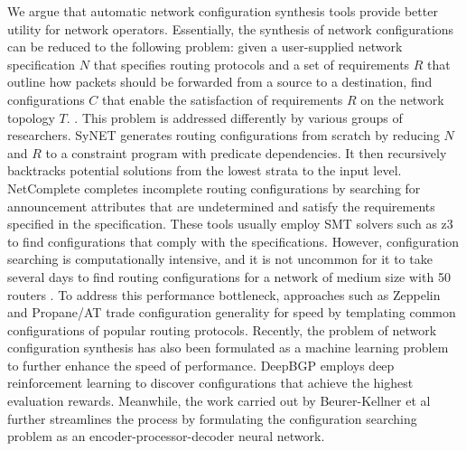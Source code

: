 \documentclass{uiucthesis2021}
\begin{document}
\noindent We argue that automatic network configuration synthesis tools provide better utility for network operators. Essentially, the synthesis of network configurations can be reduced to the following problem: given a user-supplied network specification $N$ that specifies routing protocols and a set of requirements $R$ that outline how packets should be forwarded from a source to a destination, find configurations $C$ that enable the satisfaction of requirements $R$ on the network topology $T$. \cite{10.1145/3098822.3098834}. This problem is addressed differently by various groups of researchers. SyNET \cite{10.1145/3098822.3098834} generates routing configurations from scratch by reducing $N$ and $R$ to a constraint program with predicate dependencies. It then recursively backtracks potential solutions from the lowest strata to the input level. NetComplete \cite{10.5555/3307441.3307491} completes incomplete routing configurations by searching for announcement attributes that are undetermined and satisfy the requirements specified in the specification. These tools usually employ SMT solvers such as z3 \cite{de2008z3} to find configurations that comply with the specifications. However, configuration searching is computationally intensive, and it is not uncommon for it to take several days to find routing configurations for a network of medium size with 50 routers \cite{10.5555/3307441.3307491}. To address this performance bottleneck, approaches such as Zeppelin \cite{10.1145/3179425} and Propane/AT \cite{10.1145/3062341.3062367} trade configuration generality for speed by templating common configurations of popular routing protocols. Recently, the problem of network configuration synthesis has also been formulated as a machine learning problem to further enhance the speed of performance. DeepBGP \cite{10.1145/3405671.3405816} employs deep reinforcement learning to discover configurations that achieve the highest evaluation rewards. Meanwhile, the work carried out by Beurer-Kellner et al \cite{beurerkellner2022learning} further streamlines the process by formulating the configuration searching problem as an encoder-processor-decoder neural network.\\
\end{document}

